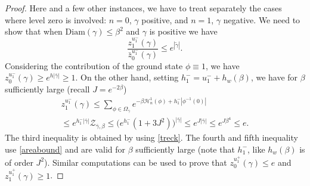 \documentclass[JEP,XML,SOM,Unicode, NoFloatCountersInSection]{cedram}
\let\mathcal\mathscr
\numberwithin{equation}{section}
\theoremstyle{plain}
\theoremstyle{definition}
\newcommand{\Diam}{\mathrm{Diam}}
\newcommand{\cH}{{\ensuremath{\mathcal H}} }
\newcommand{\cZ}{{\ensuremath{\mathcal Z}} }
\newcommand{\gb}{\beta}
\newcommand{\gO}{\Omega}
\begin{document}
\begin{proof}
Here and a few other instances,
we have to treat separately the cases where level zero is involved: $n=0$, $\gamma$ positive, and $n=1$, $\gamma$ negative.
We need to show that when $\Diam(\gamma)\le \gb^2$ and $\gamma$ is positive we have
\begin{equation*}
\frac{z^{u^-_1}_{1}(\gamma)}{\bar z^{u^-_1}_0(\gamma)}\le e^{|\tilde \gamma|}.
\end{equation*}
Considering the contribution of the ground state $\phi\equiv 1$, we have $z^{u^-_1}_{0}(\gamma)\ge e^{h|\bar \gamma|}\ge 1$.
On the other hand, setting $h^-_1=u^-_1+h_w(\gb)$,
we have for $\gb$ sufficiently large (recall $J=e^{-2\gb}$)
\begin{multline}\label{truxc}
z^{u^-_1}_{1}(\gamma)\le \sum_{\phi\in \gO_{\bar \gamma}} e^{-\gb\cH^1_n(\phi)+h^-_1|\phi^{-1}(0)|}\\[-10pt]
\le
e^{h^-_1|\bar \gamma|} \cZ_{\bar \gamma,\gb}\le \bigl(e^{h^-_1}(1+3J^2) \bigr)^{|\bar \gamma|}\le
e^{J |\bar \gamma|}\le e^{J\gb^4}\le e.
\end{multline}
The third inequality is obtained by using \eqref{treck}.
The fourth and fifth inequality use \eqref{areabound} and are valid for $\gb$ sufficiently large (note that $h^-_1$, like $h_w(\gb)$ is of order $J^2$).
Similar computations can be used to prove that $z^{u^+_1}_{0}(\gamma)\le e $ and $z^{u^+_1}_{1}(\gamma)\ge 1$.


\end{proof}
\end{document}
